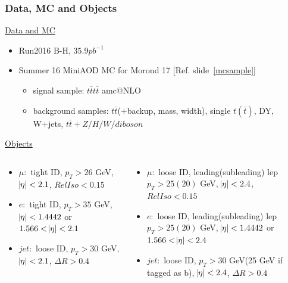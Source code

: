 \documentclass{beamer}
\begin{document}
\begin{frame}
\frametitle{Data, MC and Objects}
	\underline{\small {Data and MC}}
	\begin{itemize}
		\item {\small Run2016 B-H, $35.9 pb^{-1}$}
		\item {\small Summer 16 MiniAOD MC for Morond 17 [Ref. slide~\ref{mcsample}}]
		\begin{itemize}
			\item signal sample: $t\bar{t}t\bar{t}$ amc@NLO
			\item background samples: $t\bar{t}$(+backup, mass, width), single $t(\bar{t})$, DY, W+jets, $t\bar{t}+Z/H/W/diboson$
		\end{itemize}
	\end{itemize}
	\underline{{\small Objects}}
	\vspace{-20pt}
	\begin{columns}
		\begin{column}{0.5\textwidth}  \vspace{-15pt}
			\begin{itemize}
				\item $\mu:$ {\scriptsize tight ID, $p_{T}>26$ GeV, $\abs{\eta}<2.1$, $RelIso<0.15$} 
				\item $e:$ {\scriptsize tight ID, $p_{T}>35$ GeV, $\abs{\eta}<1.4442$ or $1.566<\abs{\eta}<2.1$} 
				\item $jet:$ {\scriptsize loose ID, $p_{T}>30$ GeV, $\abs{\eta}<2.1$, $\Delta R>0.4$} 
			\end{itemize}
		\end{column}
		\begin{column}{0.5\textwidth}
			\begin{itemize}
				\item $\mu:$ {\scriptsize loose ID, leading(subleading) lep $p_{T}>25(20)$ GeV, $\abs{\eta}<2.4$, $RelIso<0.15$}  \vspace{-5pt}
				\item $e:$ {\scriptsize loose ID, leading(subleading) lep $p_{T}>25(20)$ GeV, $\abs{\eta}<1.4442$ or $1.566<\abs{\eta}<2.4$} \vspace{-5pt}
				\item $jet:$ {\scriptsize loose ID, $p_{T}>30$ GeV(25 GeV if tagged as b), $\abs{\eta}<2.4$, $\Delta R>0.4$} 
			\end{itemize}
		\end{column}
	\end{columns}
\end{frame}
\end{document}
